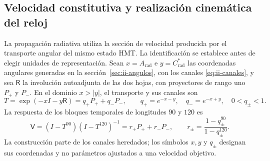 \subsection{Velocidad constitutiva y realización cinemática del reloj}
\label{v:sec:enlace-velocidad-constitutiva}

La propagación radiativa utiliza la sección de velocidad producida por el
transporte angular del mismo estado HMT. La identificación se establece
antes de elegir unidades de representación. Sean $x=A_{\mathrm{rad}}$ e
$y=C^*_{\mathrm{rad}}$ las coordenadas angulares generadas en la
sección~\ref{sec:ii-angulos}, con los canales
\eqref{eq:ii-canales}, y sea
$\mathsf R$ la involución autoadjunta de las dos hojas, con proyectores
de rango uno $P_+$ y $P_-$. En el dominio $x>|y|$, el transporte y sus
canales son
\begin{equation}
 T=\exp(-xI-y\mathsf R)=q_+P_++q_-P_-,
 \qquad q_+=e^{-x-y},\quad q_-=e^{-x+y},\quad 0<q_\pm<1.
 \label{v:eq:velocidad-transporte}
\end{equation}
La respuesta de los bloques temporales de longitudes $90$ y $120$ es
\begin{equation}
 \mathsf V=(I-T^{90})(I-T^{120})^{-1}
       =r_+P_++r_-P_-,\qquad
 r_\pm=\frac{1-q_\pm^{90}}{1-q_\pm^{120}}.
 \label{v:eq:velocidad-respuesta}
\end{equation}
La construcción parte de los canales heredados; los símbolos $x,y$ y
$q_\pm$ designan sus coordenadas y no parámetros ajustados a una velocidad
objetivo.

